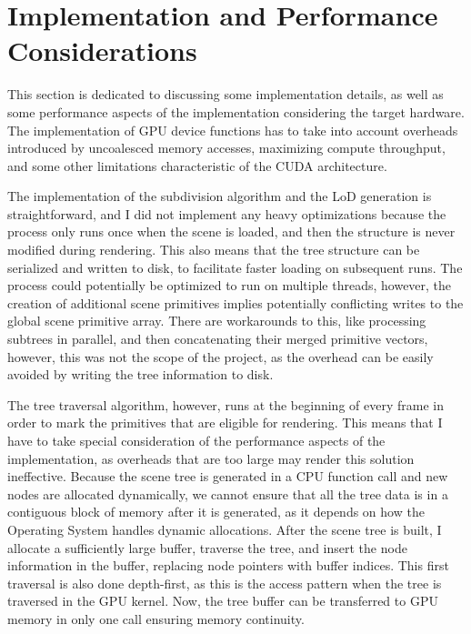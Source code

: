 \section{Implementation and Performance Considerations}
This section is dedicated to discussing some implementation details, as well as some performance aspects of the implementation considering the target hardware. The implementation of GPU device functions has to take into account overheads introduced by uncoalesced memory accesses, maximizing compute throughput, and some other limitations characteristic of the CUDA architecture.

The implementation of the subdivision algorithm and the LoD generation is straightforward, and I did not implement any heavy optimizations because the process only runs once when the scene is loaded, and then the structure is never modified during rendering. This also means that the tree structure can be serialized and written to disk, to facilitate faster loading on subsequent runs. The process could potentially be optimized to run on multiple threads, however, the creation of additional scene primitives implies potentially conflicting writes to the global scene primitive array. There are workarounds to this, like processing subtrees in parallel, and then concatenating their merged primitive vectors, however, this was not the scope of the project, as the overhead can be easily avoided by writing the tree information to disk.

The tree traversal algorithm, however, runs at the beginning of every frame in order to mark the primitives that are eligible for rendering. This means that I have to take special consideration of the performance aspects of the implementation, as overheads that are too large may render this solution ineffective. Because the scene tree is generated in a CPU function call and new nodes are allocated dynamically, we cannot ensure that all the tree data is in a contiguous block of memory after it is generated, as it depends on how the Operating System handles dynamic allocations. After the scene tree is built, I allocate a sufficiently large buffer, traverse the tree, and insert the node information in the buffer, replacing node pointers with buffer indices. This first traversal is also done depth-first, as this is the access pattern when the tree is traversed in the GPU kernel. Now, the tree buffer can be transferred to GPU memory in only one call ensuring memory continuity.

